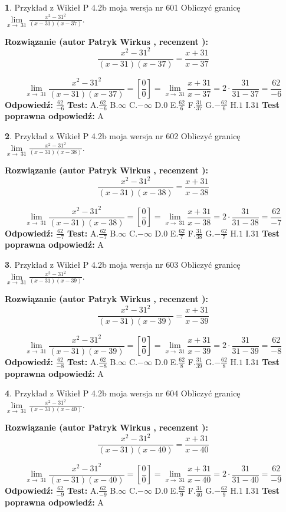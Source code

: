 \documentclass[12pt, a4paper]{article}
\theoremstyle{definition} %
\newtheorem{zad}{}
\newcommand{\zadStart}[1]{\begin{zad}#1\newline}
\newcommand{\zadStop}{\end{zad}}
\newcommand{\rozwStart}[2]{\noindent \textbf{Rozwiązanie (autor #1 , recenzent #2): }\newline}
\newcommand{\rozwStop}{\newline}
\newcommand{\odpStart}{\noindent \textbf{Odpowiedź:}\newline}
\newcommand{\odpStop}{\newline}
\newcommand{\testStart}{\noindent \textbf{Test:}\newline}
\newcommand{\testStop}{\newline}
\newcommand{\kluczStart}{\noindent \textbf{Test poprawna odpowiedź:}\newline}
\newcommand{\kluczStop}{\newline}
\begin{document}
\zadStart{Przykład z Wikieł P 4.2b moja wersja nr 601}
Obliczyć granicę $\lim\limits_{x\to\ 31}\frac{x^{2}-31^{2}}{(x-31)(x-37)}$.
\zadStop
\rozwStart{Patryk Wirkus}{}
$$\frac{x^{2}-31^{2}}{(x-31)(x-37)}=\frac{x+31}{x-37}$$

$$\lim\limits_{x\to\ 31}\frac{x^{2}-31^{2}}{(x-31)(x-37)}=[\frac{0}{0}]=\lim\limits_{x\to\ 31}\frac{x+31}{x-37}=2 \cdot \frac{31}{31-37} = \frac{62}{-6}$$
\rozwStop
\odpStart
$\frac{62}{-6}$
\odpStop
\testStart
A.$\frac{62}{-6}$
B.$\infty$
C.$-\infty$
D.$0$
E.$\frac{62}{6}$
F.$\frac{31}{37}$
G.$-\frac{62}{6}$
H.$1$
I.$31$
\testStop
\kluczStart
A
\kluczStop



\zadStart{Przykład z Wikieł P 4.2b moja wersja nr 602}
Obliczyć granicę $\lim\limits_{x\to\ 31}\frac{x^{2}-31^{2}}{(x-31)(x-38)}$.
\zadStop
\rozwStart{Patryk Wirkus}{}
$$\frac{x^{2}-31^{2}}{(x-31)(x-38)}=\frac{x+31}{x-38}$$

$$\lim\limits_{x\to\ 31}\frac{x^{2}-31^{2}}{(x-31)(x-38)}=[\frac{0}{0}]=\lim\limits_{x\to\ 31}\frac{x+31}{x-38}=2 \cdot \frac{31}{31-38} = \frac{62}{-7}$$
\rozwStop
\odpStart
$\frac{62}{-7}$
\odpStop
\testStart
A.$\frac{62}{-7}$
B.$\infty$
C.$-\infty$
D.$0$
E.$\frac{62}{7}$
F.$\frac{31}{38}$
G.$-\frac{62}{7}$
H.$1$
I.$31$
\testStop
\kluczStart
A
\kluczStop



\zadStart{Przykład z Wikieł P 4.2b moja wersja nr 603}
Obliczyć granicę $\lim\limits_{x\to\ 31}\frac{x^{2}-31^{2}}{(x-31)(x-39)}$.
\zadStop
\rozwStart{Patryk Wirkus}{}
$$\frac{x^{2}-31^{2}}{(x-31)(x-39)}=\frac{x+31}{x-39}$$

$$\lim\limits_{x\to\ 31}\frac{x^{2}-31^{2}}{(x-31)(x-39)}=[\frac{0}{0}]=\lim\limits_{x\to\ 31}\frac{x+31}{x-39}=2 \cdot \frac{31}{31-39} = \frac{62}{-8}$$
\rozwStop
\odpStart
$\frac{62}{-8}$
\odpStop
\testStart
A.$\frac{62}{-8}$
B.$\infty$
C.$-\infty$
D.$0$
E.$\frac{62}{8}$
F.$\frac{31}{39}$
G.$-\frac{62}{8}$
H.$1$
I.$31$
\testStop
\kluczStart
A
\kluczStop



\zadStart{Przykład z Wikieł P 4.2b moja wersja nr 604}
Obliczyć granicę $\lim\limits_{x\to\ 31}\frac{x^{2}-31^{2}}{(x-31)(x-40)}$.
\zadStop
\rozwStart{Patryk Wirkus}{}
$$\frac{x^{2}-31^{2}}{(x-31)(x-40)}=\frac{x+31}{x-40}$$

$$\lim\limits_{x\to\ 31}\frac{x^{2}-31^{2}}{(x-31)(x-40)}=[\frac{0}{0}]=\lim\limits_{x\to\ 31}\frac{x+31}{x-40}=2 \cdot \frac{31}{31-40} = \frac{62}{-9}$$
\rozwStop
\odpStart
$\frac{62}{-9}$
\odpStop
\testStart
A.$\frac{62}{-9}$
B.$\infty$
C.$-\infty$
D.$0$
E.$\frac{62}{9}$
F.$\frac{31}{40}$
G.$-\frac{62}{9}$
H.$1$
I.$31$
\testStop
\kluczStart
A
\kluczStop
\end{document}
